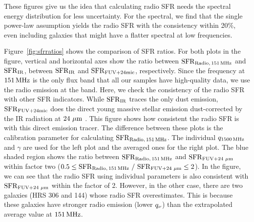 These figures give us the idea that calculating radio SFR needs the spectral energy distribution for less uncertainty.
For the spectral, we find that the single power-law assumption yields the radio SFR with the consistency within 20\%, even including galaxies that might have a flatter spectral at low frequencies.

Figure~\ref{fig:sfrratios} shows the comparison of SFR ratios.
For both plots in the figure, vertical and horizontal axes show the ratio between $\mathrm{SFR}_{\mathrm{Radio},\,151\,\mathrm{MHz}}$ and $\mathrm{SFR}_{\mathrm{IR}}$, between $\mathrm{SFR}_{\mathrm{IR}}$ and $\mathrm{SFR}_{\mathrm{FUV+24mic}}$, respectively.
Since the frequency at $151\,\mathrm{MHz}$ is the only flux band that all our samples have high-quality data, we use the radio emission at the band.
Here, we check the consistency of the radio SFR with other SFR indicators.
While $\mathrm{SFR}_{\mathrm{IR}}$ traces the only dust emission, $\mathrm{SFR}_{\mathrm{FUV+24mic}}$ does the direct young massive stellar emission dust-corrected by the IR radiation at $24\,\,\mathrm{\mu m}$ \citep{Murphy2011, Kennicutt2012}.
This figure shows how consistent the radio SFR is with this direct emission tracer.
The difference between these plots is the calibration parameter for calculating $\mathrm{SFR}_{\mathrm{Radio},\,151\,\mathrm{MHz}}$.
The individual $q_{1500\,\mathrm{MHz}}$ and $\gamma$ are used for the left plot and the averaged ones for the right plot.
The blue shaded region shows the ratio between $\mathrm{SFR}_{\mathrm{Radio},\,151\,\mathrm{MHz}}$ and $\mathrm{SFR}_{\mathrm{FUV+24\,\,\mathrm{\mu m}}}$ within factor two ($0.5 \leq \mathrm{SFR}_{\mathrm{Radio},\,151\,\mathrm{MHz}}\ /\ \mathrm{SFR}_{\mathrm{FUV+24\,\,\mathrm{\mu m}}} \leq 2$).
In the figure, we can see that the radio SFR using individual parameters is also consistent with $\mathrm{SFR}_{\mathrm{FUV+24\,\,\mathrm{\mu m}}}$ within the factor of 2.
However, in the other case, there are two galaxies (HRS 306 and 144) whose radio SFR overestimates.
This is because these galaxies have stronger radio emission (lower $q_{\nu}$) than the extrapolated average value at $151\,\mathrm{MHz}$.



%
%
